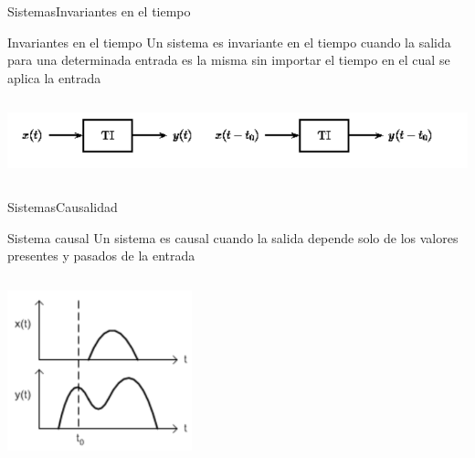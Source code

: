  \begin{frame}{Sistemas}{Invariantes en el tiempo}
    \begin{block}{Invariantes en el tiempo}
       Un sistema es invariante en el tiempo cuando la salida para una determinada entrada es la misma sin importar el tiempo en el cual se aplica la entrada
    \end{block}
    \begin{columns}[onlytextwidth]
       \center\includegraphics[width=1\textwidth]{1_clase/invariante_en_tiempo} \\
    \end{columns}
    \vfill
 \end{frame}
 \begin{frame}[c]{Sistemas}{Causalidad}
    \begin{block}{Sistema causal}
       Un sistema es causal cuando la salida depende solo de los valores presentes y pasados de la entrada
    \end{block}
    \begin{columns}[c]
       \center\includegraphics[width=0.4\textwidth]{1_clase/causalidad} \\
    \end{columns}
    \vfill
 \end{frame}
